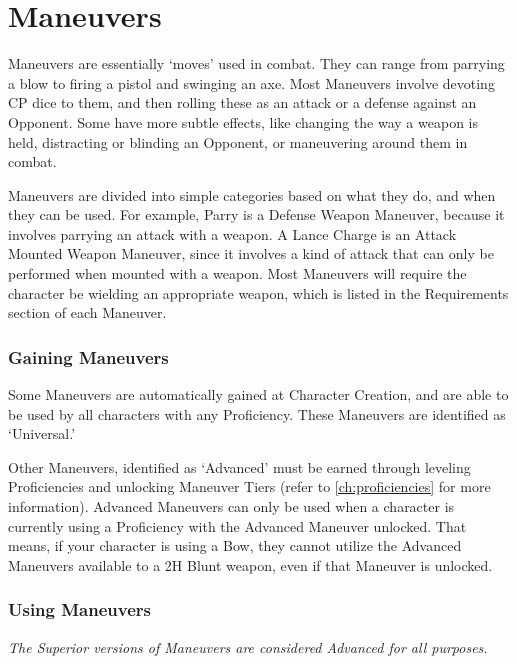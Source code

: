 \documentclass[oneside,11pt,english]{book}
\begin{document}
\chapter{Maneuvers}\label{ch:Maneuvers} %
\startcontents[chapters]
\clearpage
Maneuvers are essentially ‘moves’ used in combat. They can range from parrying a blow to firing a pistol and swinging an axe. Most Maneuvers involve devoting CP dice to them, and then rolling these as an attack or a defense against an Opponent. Some have more subtle effects, like changing the way a weapon is held, distracting or blinding an Opponent, or maneuvering around them in combat.

Maneuvers are divided into simple categories based on what they do, and when they can be used. For example, Parry is a Defense Weapon Maneuver, because it involves parrying an attack with a weapon. A Lance Charge is an Attack Mounted Weapon Maneuver, since it involves a kind of attack that can only be performed when mounted with a weapon. Most Maneuvers will require the character be wielding an appropriate weapon, which is listed in the Requirements section of each Maneuver.


\subsection{Gaining Maneuvers}
Some Maneuvers are automatically gained at Character Creation, and are able to be used by all characters with any Proficiency. These Maneuvers are identified as ‘Universal.’


Other Maneuvers, identified as ‘Advanced’ must be earned through leveling Proficiencies and unlocking Maneuver Tiers (refer to \autoref{ch:proficiencies} for more information). Advanced Maneuvers can only be used when a character is currently using a Proficiency with the Advanced Maneuver unlocked. That means, if your character is using a Bow, they cannot utilize the Advanced Maneuvers available to a 2H Blunt weapon, even if that Maneuver is unlocked.

\subsection{Using Maneuvers}
\emph{The Superior versions of Maneuvers are considered Advanced for all purposes.}
\end{document}
